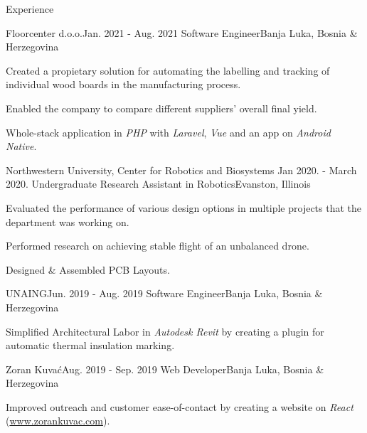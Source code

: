\documentclass{resume}
\begin{document}
\begin{rSection}{Experience}
    \begin{rSubsection}
        {Floorcenter d.o.o.}{Jan. 2021 - Aug. 2021}
        {Software Engineer}{Banja Luka, Bosnia \& Herzegovina}
        \item Created a propietary solution for automating the labelling and
            tracking of individual wood boards in the manufacturing process.
        \item Enabled the company to compare different suppliers' overall final
            yield.
        \item Whole-stack application in \textit{PHP} with \textit{Laravel},
            \textit{Vue} and an app on \textit{Android Native}.
    \end{rSubsection}

    \begin{rSubsection}
        {Northwestern University, Center for Robotics and Biosystems}
        {Jan 2020. - March 2020.}
        {Undergraduate Research Assistant in Robotics}{Evanston, Illinois}
        \item Evaluated the performance of various design options in multiple
            projects that the department was working on.
        \item Performed research on achieving stable flight of an unbalanced
            drone.
        \item Designed \& Assembled PCB Layouts.
    \end{rSubsection}
    
    \begin{rSubsection}
        {UNAING}{Jun. 2019 - Aug. 2019}
        {Software Engineer}{Banja Luka, Bosnia \& Herzegovina}
        \item Simplified Architectural Labor in \textit{Autodesk Revit} by
            creating a plugin for automatic thermal insulation marking.
    \end{rSubsection}

    \begin{rSubsection}
        {Zoran Kuva\'{c}}{Aug. 2019 - Sep. 2019}
        {Web Developer}{Banja Luka, Bosnia \& Herzegovina}
        \item Improved outreach and customer ease-of-contact by creating a
            website on \textit{React} (\url{www.zorankuvac.com}).
    \end{rSubsection}
\end{rSection}
\end{document}
